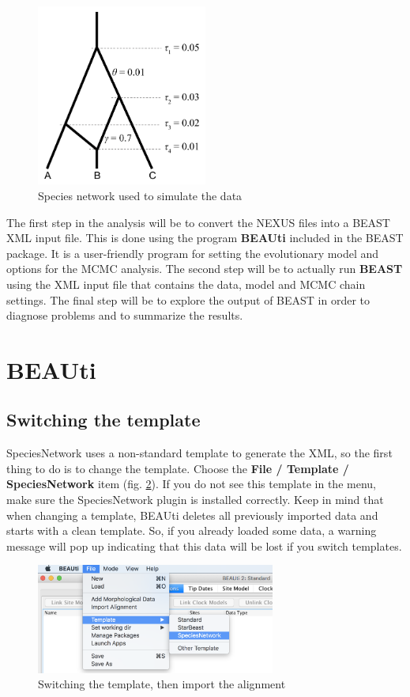 \documentclass[11pt]{article}
\begin{document}
\begin{figure}[h]
\center
\includegraphics[width=0.5\textwidth]{figs/fig1_spnetwork}
\caption{Species network used to simulate the data}
\label{fig_spnetwork}
\end{figure}

The first step in the analysis will be to convert the NEXUS files into a BEAST XML input file. This is done using the program \textbf{BEAUti} included in the BEAST package. It is a user-friendly program for setting the evolutionary model and options for the MCMC analysis. The second step will be to actually run \textbf{BEAST} using the XML input file that contains the data, model and MCMC chain settings. The final step will be to explore the output of BEAST in order to diagnose problems and to summarize the results.

\section*{BEAUti}

\subsection*{Switching the template}

SpeciesNetwork uses a non-standard template to generate the XML, so the first thing to do is to change the template. Choose the \textbf{File / Template / SpeciesNetwork} item (fig. \ref{fig_template}). If you do not see this template in the menu, make sure the SpeciesNetwork plugin is installed correctly.
Keep in mind that when changing a template, BEAUti deletes all previously imported data and starts with a clean template. So, if you already loaded some data, a warning message will pop up indicating that this data will be lost if you switch templates.

\begin{figure}[h]
\center
\includegraphics[width=0.7\textwidth]{figs/fig2_template}
\caption{Switching the template, then import the alignment}
\label{fig_template}
\end{figure}
\end{document}
